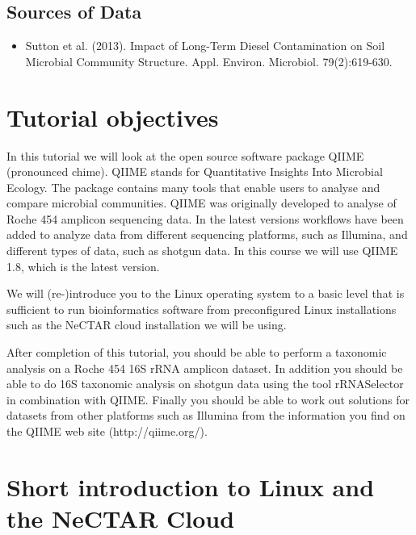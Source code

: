 \documentclass[a4paper,12pt,twoside]{memoir}
\begin{document}
\subsection{Sources of Data}
\begin{itemize}
    \item Sutton et al. (2013). Impact of Long-Term Diesel Contamination on Soil Microbial Community Structure. Appl. Environ. Microbiol. 79(2):619-630. 
\end{itemize}

\clearpage

\section{Tutorial objectives}

\begin{information}
In this tutorial we will look at the open source software package QIIME (pronounced chime). QIIME stands for Quantitative Insights Into Microbial Ecology. The package contains many tools that enable users to analyse and compare microbial communities. QIIME was originally developed to analyse of Roche 454 amplicon sequencing data. In the latest versions workflows have been added to analyze data from different sequencing platforms, such as Illumina, and different types of data, such as shotgun data. In this course we will use QIIME 1.8, which is the latest version.

We will (re-)introduce you to the Linux operating system to a basic level that is sufficient to run bioinformatics software from preconfigured Linux installations such as the NeCTAR cloud installation we will be using. 

After completion of this tutorial, you should be able to perform a taxonomic analysis on a Roche 454 16S rRNA amplicon dataset. In addition you should be able to do 16S taxonomic analysis on shotgun data using the tool rRNASelector in combination with QIIME.
Finally you should be able to work out solutions for datasets from other platforms such as Illumina from the information you find on the QIIME web site (http://qiime.org/). 
\end{information}

\newpage

\section{Short introduction to Linux and the NeCTAR Cloud}
\end{document}
